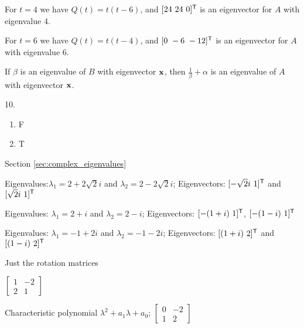 \begin{multicols}{2}
\begin{enumerate}[i.]
	For $t=4$ we have $Q(t) = t(t-6)$, and $[24 \ 24 \ 0]^{\mathsf{T}}$ is an eigenvector for $A$ with eigenvalue $4$. 
	
	For $t=6$ we have $Q(t) = t(t-4)$, and $[0 \ -6 \ -12]^{\mathsf{T}}$ is an eigenvector for $A$ with eigenvalue $6$. 
	\end{enumerate}

\ea

\item If $\beta$ is an eigenvalue of $B$ with eigenvector $\mathbf{x}$, then $\frac{1}{\beta} + \alpha$ is an eigenvalue of $A$ with eigenvector $\mathbf{x}$. 

\oee

\be
\item[10.]
\begin{enumerate}[label=(\alph*), leftmargin=1\parindent]
\item F
\item T
 

\end{enumerate}

\ee

\hspace{-0.25in} Section \ref{sec:complex_eigenvalues}

\obe
\item 
\ba
\item Eigenvalues:$\lambda_1 = 2+2\sqrt{2}i$ and $\lambda_2 = 2-2\sqrt{2}i$; Eigenvectors:  $[-\sqrt{2}i \ 1]^{\mathsf{T}}$ and  $[\sqrt{2}i \ 1]^{\mathsf{T}}$

\item Eigenvalues: $\lambda_1 = 2+i$ and $\lambda_2 = 2-i$; Eigenvectors:  $[-(1+i) \ 1]^{\mathsf{T}}$,  $[-(1-i) \ 1]^{\mathsf{T}}$

\item Eigenvalues: $\lambda_1 = -1+2i$ and $\lambda_2 = -1-2i$; Eigenvectors:   $[(1+i) \ 2]^{\mathsf{T}}$ and $[(1-i) \ 2]^{\mathsf{T}}$

\ea

\item Just the rotation matrices

\item $\left[ \begin{array}{cr} 1&-2 \\ 2&1 \end{array} \right]$

\item 
\ba
\item Characteristic polynomial $\lambda^2+a_1\lambda + a_0$; $\left[ \begin{array}{cr} 0&-2\\1&2 \end{array} \right]$


\end{multicols}
